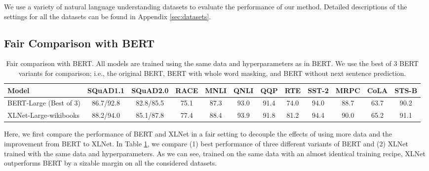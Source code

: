 We use a variety of natural language understanding datasets to evaluate the performance of our method. Detailed descriptions of the settings for all the datasets can be found in Appendix \ref{sec:datasets}.

\subsection{Fair Comparison with BERT} \label{sec:fair}
\begingroup
\setlength{\tabcolsep}{3pt}
\begin{table}[!h]
	\small
	\centering
	
	\begin{tabular}{p{1.8cm}|ccccccccccc}
		\toprule
		\bf Model & SQuAD1.1 & SQuAD2.0 & RACE & MNLI & QNLI & QQP & RTE & SST-2 & MRPC & CoLA & STS-B \\
		\midrule
		BERT-Large (Best of 3)  & 86.7/92.8 & 82.8/85.5 & 75.1 & 87.3 & 93.0 & 91.4 &  74.0 & 94.0 & 88.7 & 63.7 & 90.2 \\\midrule
		XLNet-Large-wikibooks & 88.2/94.0 & 85.1/87.8 & 77.4 & 88.4 & 93.9 & 91.8 & 81.2 & 94.4 & 90.0 & 65.2 & 91.1 \\
		\bottomrule
	\end{tabular}
	\caption{\small Fair comparison with BERT. All models are trained using the same data and hyperparameters as in BERT. We use the best of 3 BERT variants for comparison; i.e., the original BERT, BERT with whole word masking, and BERT without next sentence prediction.}
	\label{tab:fair}
\end{table}
\endgroup
Here, we first compare the performance of BERT and XLNet in a fair setting to decouple the effects of using more data and the improvement from BERT to XLNet. In Table \ref{tab:fair}, we compare (1) best performance of three different variants of BERT and (2) XLNet trained with the same data and hyperparameters.
As we can see, trained on the same data with an almost identical training recipe, XLNet outperforms BERT by a sizable margin on all the considered datasets.


